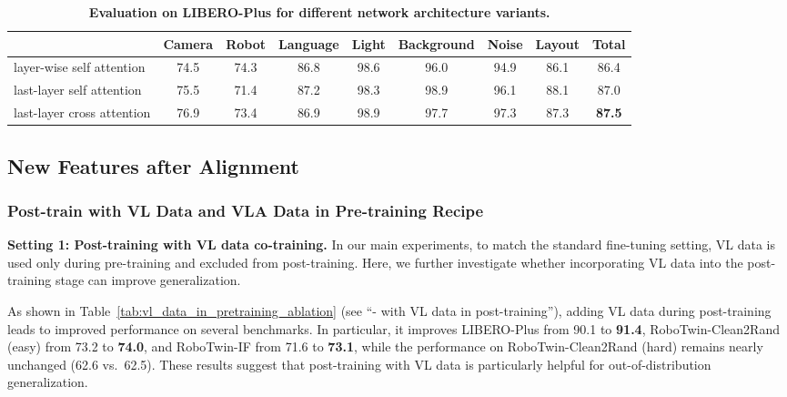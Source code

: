 \begin{table}[!t]
\centering
\caption{\textbf{Evaluation on LIBERO-Plus for different network architecture variants.}}
\label{tab:libero_plus_diff_arch}
\small
\tabcolsep 3pt
\begin{tabular}{lcccccccc}
\toprule
& \textbf{Camera} & \textbf{Robot} & \textbf{Language} & \textbf{Light} & \textbf{Background} & \textbf{Noise} & \textbf{Layout} & \textbf{Total} \\
\midrule
layer-wise self attention & 74.5 & 74.3 & 86.8 & 98.6 & 96.0 & 94.9 & 86.1 & 86.4 \\
last-layer self attention & 75.5 & 71.4 & 87.2 & 98.3 & 98.9 & 96.1 & 88.1 & 87.0 \\
last-layer cross attention & 76.9 & 73.4 & 86.9 & 98.9 & 97.7 & 97.3 & 87.3 & {\textbf{87.5}} \\
\bottomrule
\end{tabular}
\end{table}


\subsection{New Features after Alignment}

\subsubsection{Post-train with VL Data and VLA Data in Pre-training Recipe}
\label{sec:mixposttrain}

\textbf{Setting 1: Post-training with VL data co-training.} In our main experiments, to match the standard fine-tuning setting, VL data is used only during pre-training and excluded from post-training. Here, we further investigate whether incorporating VL data into the post-training stage can improve generalization.

As shown in Table~\ref{tab:vl_data_in_pretraining_ablation} (see ``- with VL data in post-training''), adding VL data during post-training leads to improved performance on several benchmarks. In particular, it improves LIBERO-Plus from 90.1 to \textbf{91.4}, RoboTwin-Clean2Rand (easy) from 73.2 to \textbf{74.0}, and RoboTwin-IF from 71.6 to \textbf{73.1}, while the performance on RoboTwin-Clean2Rand (hard) remains nearly unchanged (62.6 vs.\ 62.5). These results suggest that post-training with VL data is particularly helpful for out-of-distribution generalization.

